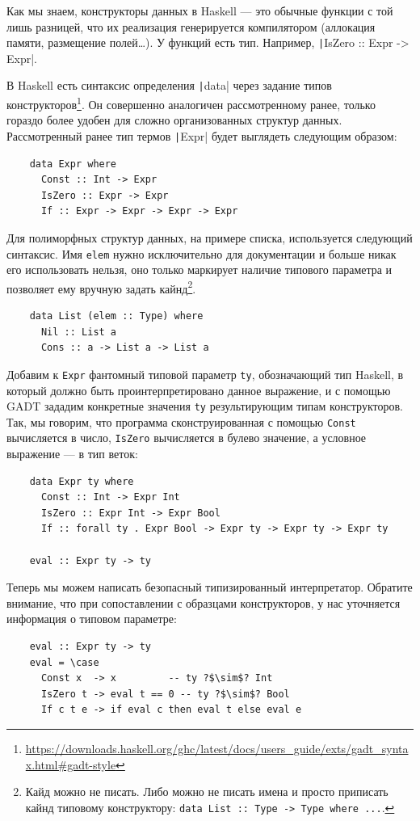 Как мы знаем, конструкторы данных в Haskell --- это обычные функции с той лишь разницей, что их реализация генерируется компилятором (аллокация памяти, размещение полей\ldots).
У функций есть тип.
Например, \texttt|IsZero :: Expr -> Expr|.

В Haskell есть синтаксис определения \texttt|data| через задание типов конструкторов\footnote{\url{https://downloads.haskell.org/ghc/latest/docs/users_guide/exts/gadt_syntax.html\#gadt-style}}.
Он совершенно аналогичен рассмотренному ранее, только гораздо более удобен для сложно организованных структур данных.
Рассмотренный ранее тип термов \texttt|Expr| будет выглядеть следующим образом:
\begin{verbatim}
    data Expr where
      Const :: Int -> Expr
      IsZero :: Expr -> Expr
      If :: Expr -> Expr -> Expr -> Expr
\end{verbatim}

Для полиморфных структур данных, на примере списка, используется следующий синтаксис.
Имя \texttt{elem} нужно исключительно для документации и больше никак его использовать нельзя, оно только маркирует наличие типового параметра и позволяет ему вручную задать кайнд\footnote{Кайд можно не писать. Либо можно не писать имена и просто приписать кайнд типовому конструктору: \texttt{data List :: Type -> Type where ...}.}.
\begin{verbatim}
    data List (elem :: Type) where
      Nil :: List a
      Cons :: a -> List a -> List a
\end{verbatim}

Добавим к \texttt{Expr} фантомный типовой параметр \texttt{ty}, обозначающий тип Haskell, в который должно быть проинтерпретировано данное выражение, и с помощью GADT зададим конкретные значения \texttt{ty} результирующим типам конструкторов.
Так, мы говорим, что программа сконструированная с помощью \texttt{Const} вычисляется в число, \texttt{IsZero} вычисляется в булево значение, а условное выражение --- в тип веток:
\begin{verbatim}
    data Expr ty where
      Const :: Int -> Expr Int
      IsZero :: Expr Int -> Expr Bool
      If :: forall ty . Expr Bool -> Expr ty -> Expr ty -> Expr ty

    eval :: Expr ty -> ty
\end{verbatim}

Теперь мы можем написать безопасный типизированный интерпретатор.
Обратите внимание, что при сопоставлении с образцами конструкторов, у нас уточняется информация о типовом параметре:
\begin{verbatim}
    eval :: Expr ty -> ty
    eval = \case
      Const x  -> x         -- ty ?$\sim$? Int
      IsZero t -> eval t == 0 -- ty ?$\sim$? Bool
      If c t e -> if eval c then eval t else eval e
\end{verbatim}

